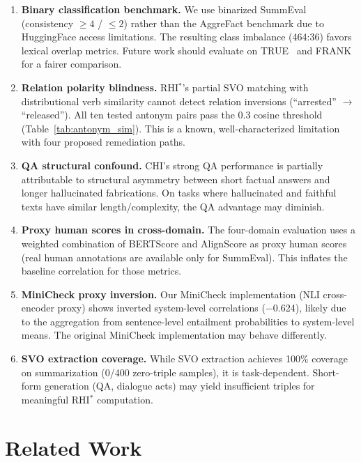 \documentclass[11pt]{article}
\begin{document}
\begin{enumerate}
\item \textbf{Binary classification benchmark.} We use binarized SummEval (consistency $\geq 4$ / $\leq 2$) rather than the AggreFact benchmark due to HuggingFace access limitations. The resulting class imbalance (464:36) favors lexical overlap metrics. Future work should evaluate on TRUE~\cite{honovich2022true} and FRANK for a fairer comparison.

\item \textbf{Relation polarity blindness.} RHI$^*$'s partial SVO matching with distributional verb similarity cannot detect relation inversions (``arrested'' $\to$ ``released''). All ten tested antonym pairs pass the 0.3 cosine threshold (Table~\ref{tab:antonym_sim}). This is a known, well-characterized limitation with four proposed remediation paths.

\item \textbf{QA structural confound.} CHI's strong QA performance is partially attributable to structural asymmetry between short factual answers and longer hallucinated fabrications. On tasks where hallucinated and faithful texts have similar length/complexity, the QA advantage may diminish.

\item \textbf{Proxy human scores in cross-domain.} The four-domain evaluation uses a weighted combination of BERTScore and AlignScore as proxy human scores (real human annotations are available only for SummEval). This inflates the baseline correlation for those metrics.

\item \textbf{MiniCheck proxy inversion.} Our MiniCheck implementation (NLI cross-encoder proxy) shows inverted system-level correlations ($-$0.624), likely due to the aggregation from sentence-level entailment probabilities to system-level means. The original MiniCheck implementation may behave differently.

\item \textbf{SVO extraction coverage.} While SVO extraction achieves 100\% coverage on summarization (0/400 zero-triple samples), it is task-dependent. Short-form generation (QA, dialogue acts) may yield insufficient triples for meaningful RHI$^*$ computation.
\end{enumerate}


\section{Related Work}
\end{document}
